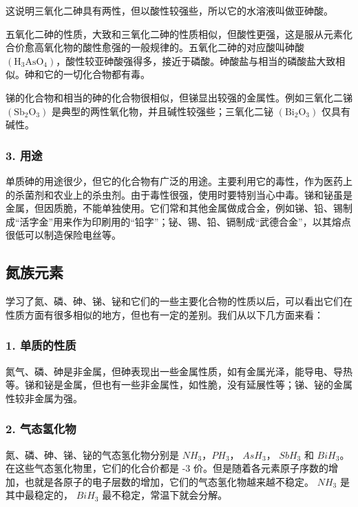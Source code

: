 这说明三氧化二砷具有两性，但以酸性较强些，所以它的水溶液叫做亚砷酸。

五氧化二砷的性质，大致和三氧化二砷的性质相似，但酸性更强，这是服从元素化合价愈高氧化物的酸性愈强的一般规律的。五氧化二砷的对应酸叫砷酸
\(\left(\mathrm{H}_{3}\mathrm{AsO}_{4}\right)\)，酸性较亚砷酸强得多，接近于磷酸。砷酸盐与相当的磷酸盐大致相似。砷和它的一切化合物都有毒。

锑的化合物和相当的砷的化合物很相似，但锑显出较强的金属性。例如三氧化二锑
\(\left(\mathrm{Sb}_{2}\mathrm{O}_{3}\right)\)
是典型的两性氧化物，并且碱性较强些；三氧化二铋
\(\left(\mathrm{Bi}_{2}\mathrm{O}_{3}\right)\) 仅具有碱性。

\subsubsection{3. 用途}

单质砷的用途很少，但它的化合物有广泛的用途。主要利用它的毒性，作为医药上的杀菌剂和农业上的杀虫剂。由于毒性很强，使用时要特别当心中毒。锑和铋虽是金属，但因质脆，不能单独使用。它们常和其他金属做成合金，例如锑、铅、锡制成``活字金''用来作为印刷用的``铅字''；铋、锡、铅、镉制成``武德合金''，以其熔点很低可以制造保险电丝等。

\subsection{氮族元素}

学习了氮、磷、砷、锑、铋和它们的一些主要化合物的性质以后，可以看出它们在性质方面有很多相似的地方，但也有一定的差别。我们从以下几方面来看：

\subsubsection{1. 单质的性质}

氮气、磷、砷是非金属，但砷表现出一些金属性质，如有金属光泽，能导电、导热等。锑和铋是金属，但也有一些非金属性，如性脆，没有延展性等；锑、铋的金属性较非金属为强。

\subsubsection{2. 气态氢化物}

氮、磷、砷、锑、铋的气态氢化物分别是 \(NH_{3}\)，\(PH_{3}\)，
\(AsH_{3}\)， \(SbH_{3}\) 和
\(BiH_{3}\)。在这些气态氢化物里，它们的化合价都是 -3
价。但是随着各元素原子序数的增加，也就是各原子的电子层数的增加，它们的气态氢化物越来越不稳定。
\(NH_{3}\) 是其中最稳定的， \(BiH_{3}\) 最不稳定，常温下就会分解。

